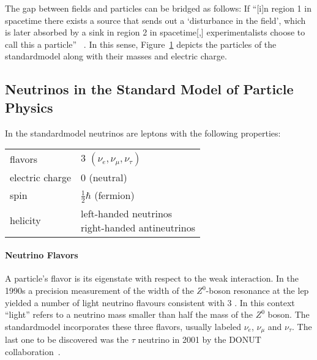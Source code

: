 The gap between fields and particles can be bridged as follows: If ``[i]n region 1 in spacetime there exists a source that sends out a `disturbance in the field', which is later absorbed by a sink in region 2 in spacetime[,] experimentalists choose to call this a particle'' ~\cite{zee2003quantum}. In this sense, Figure~\ref{fig:standardmodel} depicts the particles of the \gls{standardmodel} along with their masses and electric charge.

\begin{figure}[t]
	\begin{center}
		\def\svgwidth{\linewidth}
	\end{center}
	\label{fig:standardmodel}
\end{figure}

\subsection{Neutrinos in the Standard Model of Particle Physics}
In the \gls{standardmodel} neutrinos are leptons with the following properties:~
\begin{center}
\begin{tabular}{ll}
    \toprule
    flavors & 3 $(\nu_e, \nu_\mu, \nu_\tau)$ \\
    electric charge & 0 (neutral) \\
    spin & $\frac{1}{2} \hbar$ (fermion) \\
    helicity & \makecell[lt]{left-handed neutrinos \\ right-handed antineutrinos} \\
    \bottomrule
\end{tabular}
\end{center}

\paragraph{Neutrino Flavors}
A particle's flavor is its eigenstate with respect to the weak interaction. In the 1990s a precision measurement of the width of the $Z^0$-boson resonance at the \gls{lep} yielded a number of light neutrino flavours consistent with 3 \cite{NumberOfNeutrinos}. In this context ``light'' refers to a neutrino mass smaller than half the mass of the $Z^0$ boson. The \gls{standardmodel} incorporates these three flavors, usually labeled $\nu_e$, $\nu_\mu$ and $\nu_\tau$. The last one to be discovered was the $\tau$ neutrino in 2001 by the DONUT collaboration~\cite{Kodama2000}.

